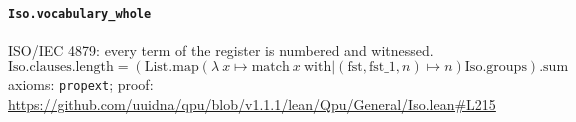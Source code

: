 \documentclass[11pt]{article}
\begin{document}
\paragraph{\texttt{Iso.vocabulary\_whole}}
ISO/IEC 4879: every term of the register is numbered and witnessed.
\[ \mathrm{Iso.clauses.length} = (\mathrm{List.map} (\lambda \ x \mapsto \mathrm{match}\ x\ \mathrm{with} | (\mathrm{fst}, \mathrm{fst\_1}, n) \mapsto n) \mathrm{Iso.groups})\mathrm{.sum} \]
\noindent axioms: \texttt{propext}; proof: \url{https://github.com/uuidna/qpu/blob/v1.1.1/lean/Qpu/General/Iso.lean\#L215}
\end{document}
